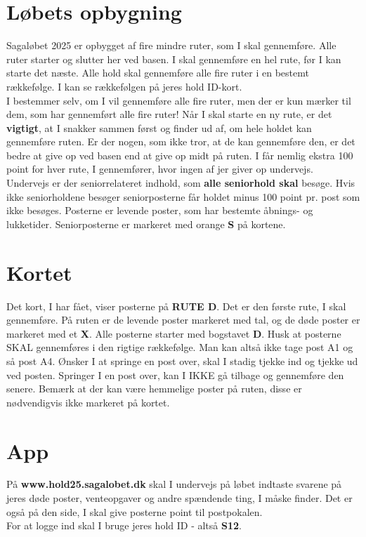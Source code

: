\section{Løbets opbygning}
Sagaløbet 2025 er opbygget af fire mindre ruter, som I skal gennemføre. Alle ruter starter og slutter her ved basen. I skal gennemføre en hel rute, før I kan starte det næste. Alle hold skal gennemføre alle fire ruter i en bestemt rækkefølge. I kan se rækkefølgen på jeres hold ID-kort.\\\newline
I bestemmer selv, om I vil gennemføre alle fire ruter, men der er kun mærker til dem, som har gennemført alle fire ruter! Når I skal starte en ny rute, er det \textbf{vigtigt}, at I snakker sammen først og finder ud af, om hele holdet kan gennemføre ruten. Er der nogen, som ikke tror, at de kan gennemføre den, er det bedre at give op ved basen end at give op midt på ruten. I får nemlig ekstra 100 point for hver rute, I gennemfører, hvor ingen af jer giver op undervejs.\\
\newline
Undervejs er der seniorrelateret indhold, som \textbf{alle seniorhold skal} besøge. Hvis ikke seniorholdene besøger seniorposterne får holdet minus 100 point pr. post som ikke besøges. Posterne er levende poster, som har bestemte åbnings- og lukketider. Seniorposterne er markeret med orange \textbf{S} på kortene.\\
\newline
\section{Kortet}
Det kort, I har fået, viser posterne på \textbf{RUTE D}. Det er den første rute, I skal gennemføre. På ruten er de levende poster markeret med tal, og de døde poster er markeret med et \textbf{X}. Alle posterne starter med bogstavet \textbf{D}. Husk at posterne SKAL gennemføres i den rigtige rækkefølge. Man kan altså ikke tage post A1 og så post A4. Ønsker I at springe en post over, skal I stadig tjekke ind og tjekke ud ved posten. Springer I en post over, kan I IKKE gå tilbage og gennemføre den senere. Bemærk at der kan være hemmelige poster på ruten, disse er nødvendigvis ikke markeret på kortet.
\section{App}
På \textbf{www.hold25.sagalobet.dk} skal I undervejs på løbet indtaste svarene på jeres døde poster, venteopgaver og andre spændende ting, I måske finder. Det er også på den side, I skal give posterne point til postpokalen.\\
For at logge ind skal I bruge jeres hold ID - altså \textbf{S12}.
\newpage
